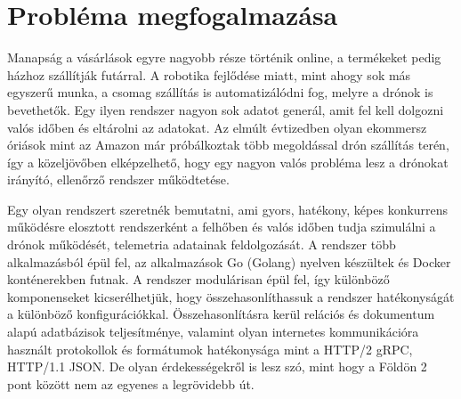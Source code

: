 
\section{Probléma megfogalmazása}
Manapság a vásárlások egyre nagyobb része történik online, a termékeket pedig házhoz szállítják futárral.
A robotika fejlődése miatt, mint ahogy sok más egyszerű munka, a csomag szállítás is automatizálódni fog, melyre a drónok is bevethetők.
Egy ilyen rendszer nagyon sok adatot generál, amit fel kell dolgozni valós időben és eltárolni az adatokat.
Az elmúlt évtizedben olyan ekommersz óriások mint az Amazon már próbálkoztak több megoldással drón szállítás terén, így a közeljövőben elképzelhető, hogy egy nagyon valós probléma lesz a drónokat irányító, ellenőrző rendszer működtetése.

Egy olyan rendszert szeretnék bemutatni, ami gyors, hatékony, képes konkurrens működésre elosztott rendszerként a felhőben és valós időben tudja szimulálni a drónok működését, telemetria adatainak feldolgozását.
A rendszer több alkalmazásból épül fel, az alkalmazások Go (Golang) nyelven készültek és Docker konténerekben futnak.
A rendszer modulárisan épül fel, így különböző komponenseket kicserélhetjük, hogy összehasonlíthassuk a rendszer hatékonyságát a különböző konfigurációkkal.
Összehasonlításra kerül relációs és dokumentum alapú adatbázisok teljesítménye, valamint olyan internetes kommunikációra használt protokollok és formátumok hatékonysága mint a HTTP/2 gRPC, HTTP/1.1 JSON.
De olyan érdekességekről is lesz szó, mint hogy a Földön 2 pont között nem az egyenes a legrövidebb út.




